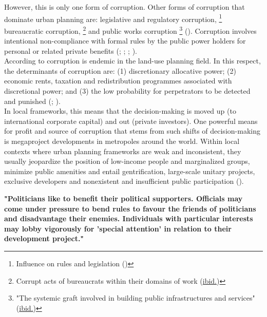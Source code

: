 \documentclass[11pt]{report}
\begin{document}
{{{However, this is only one form of corruption.
Other forms of corruption that dominate urban planning are:
legislative and regulatory corruption,
\footnote{Influence on rules and legislation (\href{Chiodelli}{\citealt{chiodelli_corruption_2015}})}
bureaucratic corruption,
\footnote{Corrupt acts of bureaucrats within their domains of work (\href{Chiodelli}{ibid.})}
and
public works corruption
\footnote{"The systemic graft involved in building public infrastructures and services" (\href{Chiodelli}{ibid.})}
(\href{Chiodelli}{\citealt{chiodelli_corruption_2015}}).
Corruption involves intentional  non-compliance  with  formal  rules by the public power holders for personal or related private benefits
(\href{Kaufmann}{\citealt{kaufmann_XXX_1997}};
\href{Begovic}{\citealt{begovic_corruption_2001}}; \href{Grubovic}{\citealt{grubovic_belgrade_2006}};
\href{Chiodelli}{\citealt{chiodelli_corruption_2015}}).
\\

According to
\href{Chiodelli}{\cite{chiodelli_corruption_2015}} corruption is endemic in the land-use planning field.
In this respect, the determinants of corruption are:
(1) discretionary allocative power; (2) economic rents, taxation and redistribution programmes associated with discretional power; and (3) the low probability for perpetrators to be detected and punished
(\href{Healey}{\citealt{healey_collaborative_1997}}; 
\href{Chiodelli}{\citealt{chiodelli_corruption_2015}}).
\\

In local frameworks, this means that the decision-making is moved up (to international corporate capital) and out (private investors).
One powerful means for profit and source of corruption that stems from such shifts of decision-making is megaproject developments in metropoles around the world.
Within local contexts where urban planning frameworks are weak and inconsistent, they usually jeopardize the position of low-income people and marginalized groups, minimize public amenities and entail gentrification, large-scale unitary projects, exclusive developers and nonexistent and insufficient public participation (\href{Fainstein}{\citealt{fainstein_just_2010}}).

\textbf{"Politicians like to benefit their political supporters. Officials may come under pressure to bend rules to favour the friends of politicians and disadvantage their enemies. Individuals with particular interests may lobby vigorously for 'special attention' in relation to their development project." \href{Healey}{\cite{healey_collaborative_1997}}}

}}}
\end{document}
